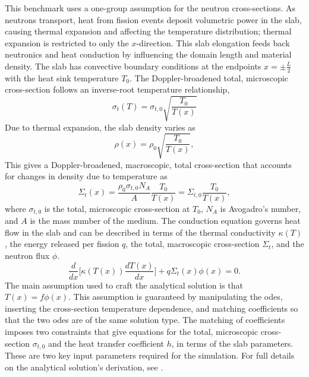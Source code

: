\documentclass[letterpaper]{mc2023}
\begin{document}
This benchmark uses a one-group assumption for the neutron cross-sections. As neutrons transport, heat from fission events deposit
volumetric power in the slab, causing thermal expansion and affecting the temperature distribution; thermal expansion is restricted
to only the $x$-direction. This slab elongation feeds back neutronics and heat conduction by influencing the domain length and
material density. The slab has convective boundary conditions at the endpoints $x=\pm \frac{L}{2}$ with the heat sink temperature
$T_{0}$. The Doppler-broadened total, microscopic cross-section follows an inverse-root temperature relationship,
\begin{equation}
    \sigma_{t}(T) = \sigma_{t,0}\sqrt{\frac{T_{0}}{T(x)}}
\end{equation}
Due to thermal expansion, the slab density varies as
\begin{equation} \label{sec:intro:density}
    \rho(x) =  \rho_{0} \sqrt{\frac{T_{0}}{T(x)}},
\end{equation}
This gives a Doppler-broadened, macroscopic, total cross-section that accounts for changes in density due to temperature as
\begin{equation} \label{sec:intro:doppler}
    \Sigma_{t}(x) = \frac{\rho_{0}\sigma_{t,0} N_{A}}{A} \frac{T_{0}}{T(x)} = \Sigma_{t,0}\frac{T_{0}}{T(x)} ,
\end{equation}
where $ \sigma_{t,0}$ is the total, microscopic cross-section at $T_{0}$, $N_{A}$ is Avogadro's number, and $A$ is the mass number
of the medium. The conduction equation governs heat flow in the slab and can be described in terms of the thermal conductivity
$\kappa(T)$, the energy released per fission $q$, the total, macroscopic cross-section $\Sigma_{t}$, and the neutron flux $\phi$.
\begin{equation}
     \frac{d}{dx}\bigg[\kappa(T(x))\frac{dT(x)}{dx}\bigg] + q \Sigma_{t}(x)\phi(x) = 0.
\end{equation}
The main assumption used to craft the analytical solution is that $T(x)=f\phi(x)$. This assumption is guaranteed by manipulating
the \glspl{ode}, inserting the cross-section temperature dependence, and matching coefficients so that the two \glspl{ode}
are of the same solution type. The matching of coefficients imposes two constraints that give equations for the total, microscopic
cross-section $\sigma_{t,0}$ and the heat transfer coefficient $h$, in terms of the slab parameters. These are two key input
parameters required for the simulation. For full details on the analytical solution's derivation, see \cite{analytical_benchmark}.
\end{document}
